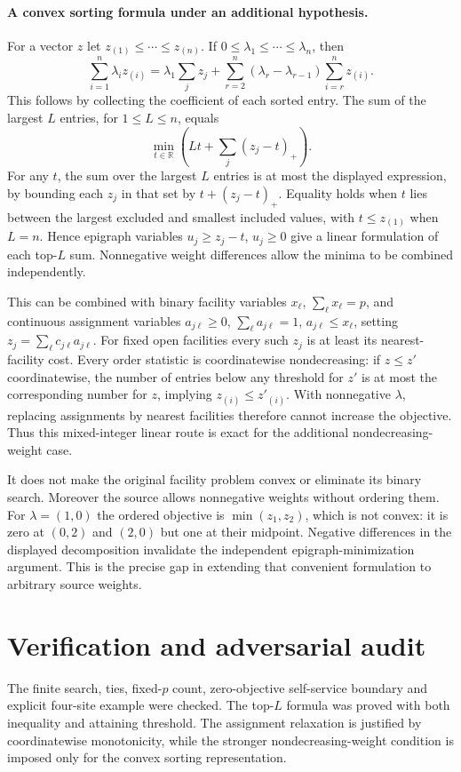 \documentclass[11pt]{article}
\begin{document}
\paragraph{A convex sorting formula under an additional hypothesis.}
For a vector $z$ let $z_{(1)}\le\cdots\le z_{(n)}$. If $0\le\lambda_1\le\cdots\le\lambda_n$, then
\[
 \sum_{i=1}^n\lambda_i z_{(i)}
 =\lambda_1\sum_jz_j+
   \sum_{r=2}^n(\lambda_r-\lambda_{r-1})\sum_{i=r}^n z_{(i)}.
\]
This follows by collecting the coefficient of each sorted entry. The sum of the largest $L$ entries, for $1\le L\le n$, equals
\[
 \min_{t\in\mathbb R}\left(Lt+\sum_j(z_j-t)_+\right).
\]
For any $t$, the sum over the largest $L$ entries is at most the displayed expression, by bounding each $z_j$ in that set by $t+(z_j-t)_+$. Equality holds when $t$ lies between the largest excluded and smallest included values, with $t\le z_{(1)}$ when $L=n$. Hence epigraph variables $u_j\ge z_j-t$, $u_j\ge0$ give a linear formulation of each top-$L$ sum. Nonnegative weight differences allow the minima to be combined independently.

This can be combined with binary facility variables $x_\ell$, $\sum_\ell x_\ell=p$, and continuous assignment variables $a_{j\ell}\ge0$, $\sum_\ell a_{j\ell}=1$, $a_{j\ell}\le x_\ell$, setting $z_j=\sum_\ell c_{j\ell}a_{j\ell}$. For fixed open facilities every such $z_j$ is at least its nearest-facility cost. Every order statistic is coordinatewise nondecreasing: if $z\le z'$ coordinatewise, the number of entries below any threshold for $z'$ is at most the corresponding number for $z$, implying $z_{(i)}\le z'_{(i)}$. With nonnegative $\lambda$, replacing assignments by nearest facilities therefore cannot increase the objective. Thus this mixed-integer linear route is exact for the additional nondecreasing-weight case.

It does not make the original facility problem convex or eliminate its binary search. Moreover the source allows nonnegative weights without ordering them. For $\lambda=(1,0)$ the ordered objective is $\min(z_1,z_2)$, which is not convex: it is zero at $(0,2)$ and $(2,0)$ but one at their midpoint. Negative differences in the displayed decomposition invalidate the independent epigraph-minimization argument. This is the precise gap in extending that convenient formulation to arbitrary source weights.
\section{Verification and adversarial audit}
The finite search, ties, fixed-$p$ count, zero-objective self-service boundary and explicit four-site example were checked. The top-$L$ formula was proved with both inequality and attaining threshold. The assignment relaxation is justified by coordinatewise monotonicity, while the stronger nondecreasing-weight condition is imposed only for the convex sorting representation.
\end{document}
